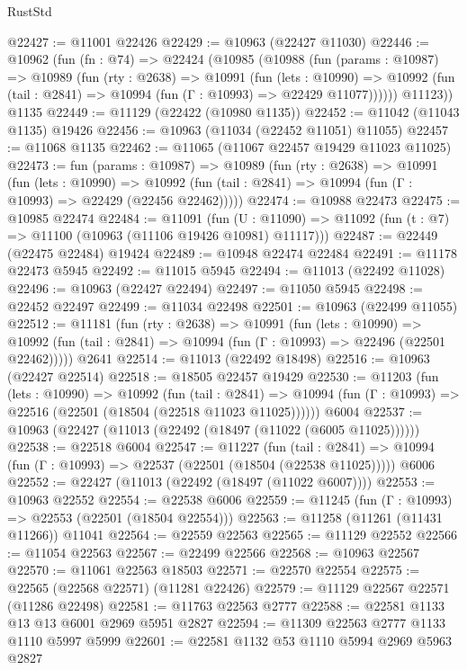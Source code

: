 \begin{lexlean}{RustStd}
\begin{coremodule}
@22427 := @11001 @22426
@22429 := @10963 (@22427 @11030)
@22446 := @10962
    (fun (fn : @74) =>
    @22424
      (@10985
        (@10988
          (fun (params : @10987) =>
          @10989
            (fun (rty : @2638) =>
            @10991
              (fun (lets : @10990) =>
              @10992 (fun (tail : @2841) => @10994 (fun (Γ : @10993) => @22429 @11077))))))
        @11123))
    @1135
@22449 := @11129 (@22422 (@10980 @1135))
@22452 := @11042 (@11043 @1135) @19426
@22456 := @10963 (@11034 (@22452 @11051) @11055)
@22457 := @11068 @1135
@22462 := @11065 (@11067 @22457 @19429 @11023 @11025)
@22473 := fun (params : @10987) =>
  @10989
    (fun (rty : @2638) =>
    @10991
      (fun (lets : @10990) =>
      @10992 (fun (tail : @2841) => @10994 (fun (Γ : @10993) => @22429 (@22456 @22462)))))
@22474 := @10988 @22473
@22475 := @10985 @22474
@22484 := @11091
    (fun (U : @11090) => @11092 (fun (t : @7) => @11100 (@10963 (@11106 @19426 @10981) @11117)))
@22487 := @22449 (@22475 @22484) @19424
@22489 := @10948 @22474 @22484
@22491 := @11178 @22473 @5945
@22492 := @11015 @5945
@22494 := @11013 (@22492 @11028)
@22496 := @10963 (@22427 @22494)
@22497 := @11050 @5945
@22498 := @22452 @22497
@22499 := @11034 @22498
@22501 := @10963 (@22499 @11055)
@22512 := @11181
    (fun (rty : @2638) =>
    @10991
      (fun (lets : @10990) =>
      @10992 (fun (tail : @2841) => @10994 (fun (Γ : @10993) => @22496 (@22501 @22462)))))
    @2641
@22514 := @11013 (@22492 @18498)
@22516 := @10963 (@22427 @22514)
@22518 := @18505 @22457 @19429
@22530 := @11203
    (fun (lets : @10990) =>
    @10992
      (fun (tail : @2841) =>
      @10994 (fun (Γ : @10993) => @22516 (@22501 (@18504 (@22518 @11023 @11025))))))
    @6004
@22537 := @10963 (@22427 (@11013 (@22492 (@18497 (@11022 (@6005 @11025))))))
@22538 := @22518 @6004
@22547 := @11227
    (fun (tail : @2841) => @10994 (fun (Γ : @10993) => @22537 (@22501 (@18504 (@22538 @11025)))))
    @6006
@22552 := @22427 (@11013 (@22492 (@18497 (@11022 @6007))))
@22553 := @10963 @22552
@22554 := @22538 @6006
@22559 := @11245 (fun (Γ : @10993) => @22553 (@22501 (@18504 @22554)))
@22563 := @11258 (@11261 (@11431 @11266)) @11041
@22564 := @22559 @22563
@22565 := @11129 @22552
@22566 := @11054 @22563
@22567 := @22499 @22566
@22568 := @10963 @22567
@22570 := @11061 @22563 @18503
@22571 := @22570 @22554
@22575 := @22565 (@22568 @22571) (@11281 @22426)
@22579 := @11129 @22567 @22571 (@11286 @22498)
@22581 := @11763 @22563 @2777
@22588 := @22581 @1133 @13 @13 @6001 @2969 @5951 @2827
@22594 := @11309 @22563 @2777 @1133 @1110 @5997 @5999
@22601 := @22581 @1132 @53 @1110 @5994 @2969 @5963 @2827

\end{coremodule}
\end{lexlean}
